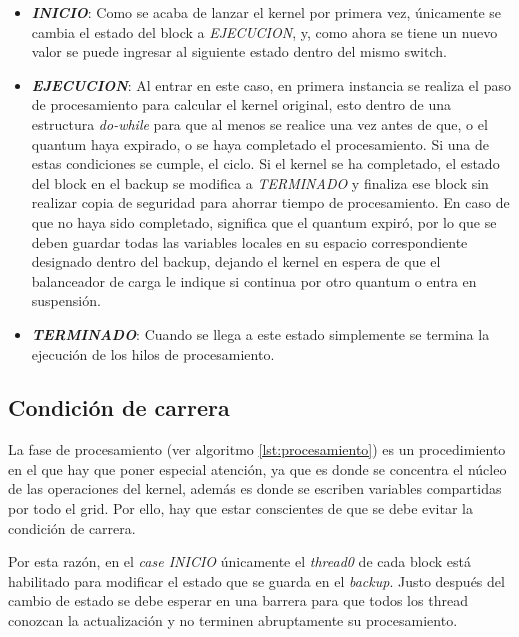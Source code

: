 \begin{itemize}
\item \textit{\textbf{INICIO}}: Como se acaba de lanzar el kernel por primera vez, únicamente se cambia el estado del block a \textit{EJECUCION}, y, como ahora se tiene un nuevo valor se puede ingresar al siguiente estado dentro del mismo switch.

\item \textit{\textbf{EJECUCION}}: Al entrar en este caso, en primera instancia se realiza el paso de procesamiento para calcular el kernel original, esto dentro de una estructura \textit{do-while} para que al menos se realice una vez antes de que, o el quantum haya expirado, o se haya completado el procesamiento. Si una de estas condiciones se cumple, el ciclo. Si el kernel se ha completado, el estado del block en el backup se modifica a \textit{TERMINADO} y finaliza ese block sin realizar copia de seguridad para ahorrar tiempo de procesamiento.
En caso de que no haya sido completado, significa que el quantum expiró, por lo que se deben guardar todas las variables locales en su espacio correspondiente designado dentro del backup, dejando el kernel en espera de que el balanceador de carga le indique si continua por otro quantum o entra en suspensión.

\item \textit{\textbf{TERMINADO}}: Cuando se llega a este estado simplemente se termina la ejecución de los hilos de procesamiento.
\end{itemize}

\subsection{Condición de carrera}

La fase de procesamiento (ver algoritmo \ref{lst:procesamiento}) es un procedimiento en el que hay que poner especial atención, ya que es donde se concentra el núcleo de las operaciones del kernel, además es donde se escriben variables compartidas por todo el grid. Por ello, hay que estar conscientes de que se debe evitar la condición de carrera.
\newline

Por esta razón, en el \textit{case INICIO} únicamente el \textit{thread0} de cada block está habilitado para modificar el estado que se guarda en el \textit{backup}. Justo después del cambio de estado se debe esperar en una barrera para que todos los thread conozcan la actualización y no terminen abruptamente su procesamiento.
\newline

